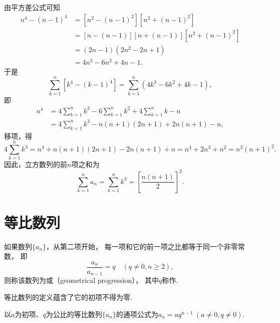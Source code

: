 由平方差公式可知
\begin{equation*}\begin{aligned}
n^4 - (n-1)^4
&= [n^2 - (n-1)^2] [n^2 + (n-1)^2] \\
&= [n - (n-1)] [n + (n-1)] [n^2 + (n-1)^2] \\
&= (2n-1) (2n^2 - 2n + 1) \\
&= 4n^3 - 6n^2 + 4n - 1.
\end{aligned}\end{equation*}
于是\begin{equation*}
\sum_{k=1}^n [k^4 - (k-1)^4]
= \sum_{k=1}^n (4k^3 - 6k^2 + 4k - 1),
\end{equation*}即\begin{equation*}\begin{aligned}
n^4
&= 4 \sum_{k=1}^n k^3 - 6 \sum_{k=1}^n k^2 + 4 \sum_{k=1}^n k - n \\
&= 4 \sum_{k=1}^n k^3 - n(n+1)(2n+1) + 2n(n+1) - n,
\end{aligned}\end{equation*}
移项，得\begin{equation*}
4 \sum_{k=1}^n k^3
= n^4 + n(n+1)(2n+1) - 2n(n+1) + n
= n^4 + 2n^3 + n^2
= n^2(n+1)^2.
\end{equation*}
因此，立方数列的前\(n\)项之和为
\begin{equation}
\sum_{k=1}^n a_n
= \sum_{k=1}^n k^3
= \left[\frac{n(n+1)}{2}\right]^2.
\end{equation}

\section{等比数列}
\begin{definition}
如果数列\(\{a_n\}\)，从第二项开始，
每一项和它的前一项之比都等于同一个非零常数，
即\begin{equation*}
	\frac{a_n}{a_{n-1}} = q
	\quad(q \neq 0,n \geq 2),
\end{equation*}
则称该数列为或（geometrical progression），
其中\(q\)称作.
\end{definition}
\begin{remark}
等比数列的定义蕴含了它的初项不得为零.
\end{remark}

\begin{property}
以\(a\)为初项、\(q\)为公比的等比数列\(\{a_n\}\)的通项公式为\(
	a_n = a q^{n-1}
	\ (a\neq0,q\neq0)
\).
\end{property}

